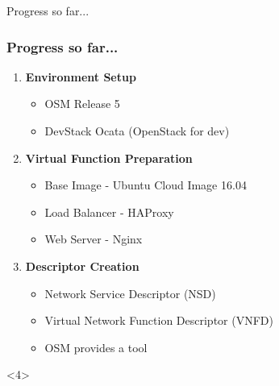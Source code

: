 \documentclass{beamer}
\begin{document}

\begin{frame}

\Huge{\centerline{Progress so far...}}

\end{frame}


\begin{frame}
\frametitle{Progress so far...}


\begin{enumerate}
	\item \textbf{Environment Setup}\\
	\begin{itemize}
		\item OSM Release 5
		\item DevStack Ocata (OpenStack for dev)
	\end{itemize} \pause

	\item \textbf{Virtual Function Preparation}\\
	\begin{itemize}
		\item Base Image - Ubuntu Cloud Image 16.04
		\item Load Balancer - HAProxy
		\item Web Server - Nginx		
	\end{itemize} \pause

	\item \textbf{Descriptor Creation}\\
	\begin{itemize}
		\item Network Service Descriptor (NSD)
		\item Virtual Network Function Descriptor (VNFD)
		\item OSM provides a tool		
	\end{itemize} \pause
	
\end{enumerate}

\begin{onlyenv}<4>
	

\end{onlyenv}
\end{frame}
\end{document}

